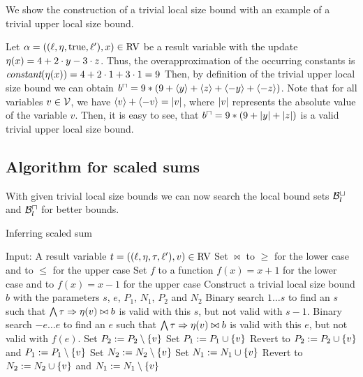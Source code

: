

We show the construction of a trivial local size bound with an example of a trivial upper local size bound.

\begin{example}
  Let $\alpha = ((\ell,\eta,\text{true},\ell'),x) \in \text{RV}$ be a result variable with the update $\eta(x) = 4 + 2 \cdot y - 3 \cdot z$.
  Thus, the overapproximation of the occurring constants is $\emph{constant}(\eta(x)) = 4 + 2 \cdot 1 + 3 \cdot 1 = 9$
  Then, by definition of the trivial upper local size bound we can obtain $b^\sqcap = 9 * (9 + \langle y\rangle + \langle z\rangle + \langle-y\rangle + \langle-z\rangle)$.
  Note that for all variables $v \in \mathcal{V}$, we have $\langle v\rangle + \langle-v\rangle = \left|v\right|$, where $\left|v\right|$ represents the absolute value of the variable $v$.
  Then, it is easy to see, that $b^\sqcap = 9 * (9 + \left|y\right| + \left|z\right|)$ is a valid trivial upper local size bound.
\end{example}

\subsection{Algorithm for scaled sums}

With given trivial local size bounds we can now search the local bound sets $\mathcal{B}^\sqcup_l$ and $\mathcal{B}^\sqcap_l$ for better bounds.

\begin{algorithm}
\caption{Inferring scaled sum}\label{ulsb_algorithm}
\begin{algorithmic}[1]
  \State Input: A result variable $t = ((\ell,\eta,\tau,\ell'),v) \in \text{RV}$
  \State Set $\bowtie$ to $\geq$ for the lower case and to $\leq$ for the upper case
  \State Set $f$ to a function $f(x)=x+1$ for the lower case and to $f(x)=x-1$ for the upper case
  \State Construct a trivial local size bound $b$ with the parameters $s$, $e$, $P_1$, $N_1$, $P_2$ and $N_2$
  \State Binary search $1 \dots s$ to find an $s$ such that $\bigwedge \tau \Rightarrow \eta(v) \bowtie b$ is valid with this $s$, but not valid with $s-1$.
  \State Binary search $-e \dots e$ to find an $e$ such that $\bigwedge \tau \Rightarrow \eta(v) \bowtie b$ is valid with this $e$, but not valid with $f(e)$.
    \State Set $P_2 := P_2 \setminus \lbrace v \rbrace$
      \State Set $P_1 := P_1 \cup \lbrace v \rbrace$
        \State Revert to $P_2 := P_2 \cup \lbrace v \rbrace$ and $P_1 := P_1 \setminus \lbrace v \rbrace$
      \EndIf
    \EndIf
    \State Set $N_2 := N_2 \setminus \lbrace v \rbrace$
      \State Set $N_1 := N_1 \cup \lbrace v \rbrace$
        \State Revert to $N_2 := N_2 \cup \lbrace v \rbrace$ and $N_1 := N_1 \setminus \lbrace v \rbrace$
      \EndIf
    \EndIf
  \EndFor
\end{algorithmic}
\end{algorithm}

